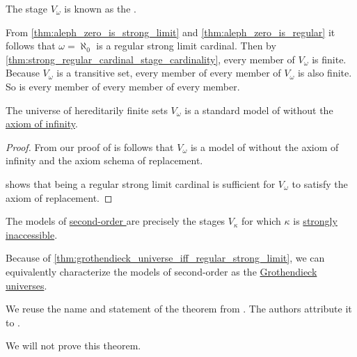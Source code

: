 \begin{definition}\label{def:universe_of_hereditary_finite_sets}
  The stage \( V_\omega \) is known as the .
\end{definition}
\begin{comments}
  \item From \cref{thm:aleph_zero_is_strong_limit} and \cref{thm:aleph_zero_is_regular} it follows that \( \omega = \aleph_0 \) is a regular strong limit cardinal. Then by \cref{thm:strong_regular_cardinal_stage_cardinality}, every member of \( V_\omega \) is finite. Because \( V_\omega \) is a transitive set, every member of every member of \( V_\omega \) is also finite. So is every member of every member of every member.
\end{comments}

\begin{proposition}\label{thm:cumulative_hierarchy_model_of_zfc_without_infinity}
  The universe of hereditarily finite sets \hyperref[def:universe_of_hereditary_finite_sets]{\( V_\omega \)} is a standard model of  without the \hyperref[def:zfc/infinity]{axiom of infinity}.
\end{proposition}
\begin{proof}
  From our proof of  is follows that \( V_\omega \) is a model of  without the axiom of infinity and the axiom schema of replacement.

   shows that being a regular strong limit cardinal is sufficient for \( V_\omega \) to satisfy the axiom of replacement.
\end{proof}

\begin{theorem}\label{thm:zermelos_quasi_categoricity_theorem}
  The models of \hyperref[def:zfc]{second-order } are precisely the stages \( V_\kappa \) for which \( \kappa \) is \hyperref[rem:strongly_inaccessible_cardinal]{strongly inaccessible}.
\end{theorem}
\begin{comments}
  \item Because of \cref{thm:grothendieck_universe_iff_regular_strong_limit}, we can equivalently characterize the models of second-order  as the \hyperref[def:grothendieck_universe]{Grothendieck universes}.

  \item We reuse the name and statement of the theorem from \cite[thm. 1]{Zermelo2010Collection:GrenzzahlenUndMengenbereiche}. The authors attribute it to \textcite{Zermelo2010Collection:GrenzzahlenUndMengenbereiche}.

  \item We will not prove this theorem.
\end{comments}

